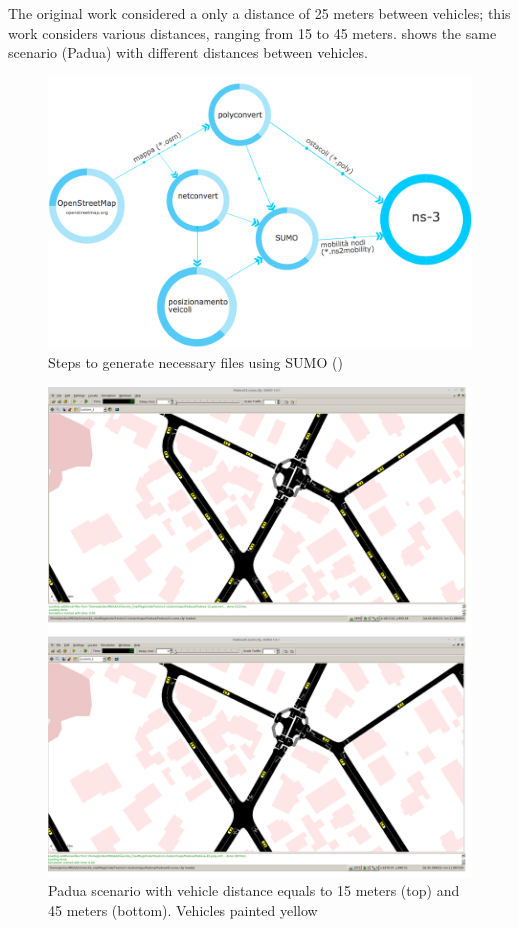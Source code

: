 		The original work considered a only a distance of 25 meters between vehicles; this work considers various distances, ranging from 15 to 45 meters.   shows the same scenario (Padua) with different distances between vehicles.

		\begin{figure}[H]
			\centering
			\includegraphics[width=\textwidth]{immagini/sumo-process}
			\caption{Steps to generate necessary files using SUMO (\cite{ROM2017})}
			\label{fig:sumo-process}
		\end{figure}
		
		\begin{figure}[H]
			\centering
			\includegraphics[width=\textwidth]{immagini/sumo-distances}
			\caption{Padua scenario with vehicle distance equals to 15 meters (top) and 45 meters (bottom). Vehicles painted yellow}
			\label{fig:sumo-distances}
		\end{figure}


